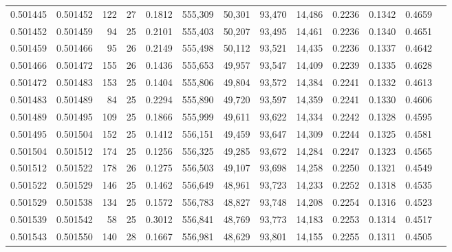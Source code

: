 \begin{tabular}{rrrrrrrrrrrrr}
0.501445 & 0.501452 & 122 &  27 &                                     0.1812 & 555,309 &  50,301 &  93,470 &  14,486 & 0.2236 & 0.1342 & 0.4659 \\
0.501452 & 0.501459 &  94 &  25 &                                     0.2101 & 555,403 &  50,207 &  93,495 &  14,461 & 0.2236 & 0.1340 & 0.4651 \\
0.501459 & 0.501466 &  95 &  26 &                                     0.2149 & 555,498 &  50,112 &  93,521 &  14,435 & 0.2236 & 0.1337 & 0.4642 \\
0.501466 & 0.501472 & 155 &  26 &                                     0.1436 & 555,653 &  49,957 &  93,547 &  14,409 & 0.2239 & 0.1335 & 0.4628 \\
0.501472 & 0.501483 & 153 &  25 &                                     0.1404 & 555,806 &  49,804 &  93,572 &  14,384 & 0.2241 & 0.1332 & 0.4613 \\
0.501483 & 0.501489 &  84 &  25 &                                     0.2294 & 555,890 &  49,720 &  93,597 &  14,359 & 0.2241 & 0.1330 & 0.4606 \\
0.501489 & 0.501495 & 109 &  25 &                                     0.1866 & 555,999 &  49,611 &  93,622 &  14,334 & 0.2242 & 0.1328 & 0.4595 \\
0.501495 & 0.501504 & 152 &  25 &                                     0.1412 & 556,151 &  49,459 &  93,647 &  14,309 & 0.2244 & 0.1325 & 0.4581 \\
0.501504 & 0.501512 & 174 &  25 &                                     0.1256 & 556,325 &  49,285 &  93,672 &  14,284 & 0.2247 & 0.1323 & 0.4565 \\
0.501512 & 0.501522 & 178 &  26 &                                     0.1275 & 556,503 &  49,107 &  93,698 &  14,258 & 0.2250 & 0.1321 & 0.4549 \\
0.501522 & 0.501529 & 146 &  25 &                                     0.1462 & 556,649 &  48,961 &  93,723 &  14,233 & 0.2252 & 0.1318 & 0.4535 \\
0.501529 & 0.501538 & 134 &  25 &                                     0.1572 & 556,783 &  48,827 &  93,748 &  14,208 & 0.2254 & 0.1316 & 0.4523 \\
0.501539 & 0.501542 &  58 &  25 &                                     0.3012 & 556,841 &  48,769 &  93,773 &  14,183 & 0.2253 & 0.1314 & 0.4517 \\
0.501543 & 0.501550 & 140 &  28 &                                     0.1667 & 556,981 &  48,629 &  93,801 &  14,155 & 0.2255 & 0.1311 & 0.4505 \\

\end{tabular}
